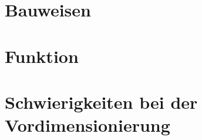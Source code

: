 \section{Bauweisen}
\label{sec:bauwesien}

\pagebreak

\section{Funktion}
\label{sec:funktion}

\pagebreak

\section{Schwierigkeiten bei der Vordimensionierung}
\label{sec:schwierigkeitenvordimensionierung}

\pagebreak